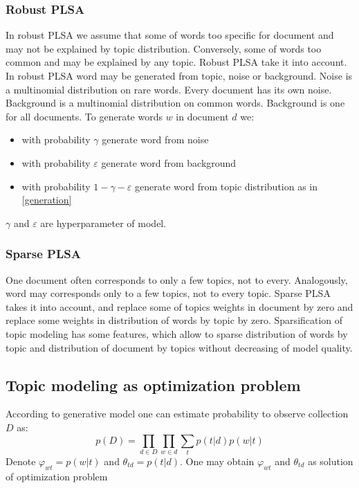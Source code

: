 \documentclass{article}
\begin{document}
        \subsubsection{Robust PLSA}
            In robust PLSA we assume that some of words too specific for document and may not be explained by topic 
            distribution. Conversely, some of words too common and may be explained by any topic.
            Robust PLSA take it into account. In robust PLSA word may be generated from topic, noise or background.
            Noise is a multinomial distribution on rare words. Every document has its own noise.
            Background is a multinomial distribution on common words. Background is one for all documents.  
            To generate words $w$  in document $d$ we: 
            \begin{itemize}
                \item with probability $\gamma$ generate word from noise
                \item with probability $\varepsilon$ generate word from background
                \item with probability $1 - \gamma - \varepsilon$ generate word from topic
		    distribution as in \ref{generation}
            \end{itemize}
            $\gamma$ and $\varepsilon$ are hyperparameter of model.  
        
        \subsubsection{Sparse PLSA}
            One document often corresponds to only a few topics, not to every. Analogously,
            word may corresponds only to a few topics, not to every topic. Sparse PLSA takes it into account,
            and replace some of topics weights in document by zero and replace some weights in distribution
            of words by topic by zero. Sparsification of topic modeling has some features, which allow to sparse distribution of 
            words by topic and distribution of document by topics without decreasing of model quality. 
    
    
        \subsection{Topic modeling as optimization problem}
            According to generative model one can estimate probability to observe collection $D$ as:
            \begin{equation} p(D) = \prod_{d \in D} \prod_{w \in d} \sum_{t} p(t|d) p(w|t) \end{equation}
            Denote $\varphi_{wt} = p(w|t)$ and $\theta_{td} = p(t|d)$. One may obtain $\varphi_{wt}$ 
            and $\theta_{td}$ as solution of optimization problem
            
\end{document}
